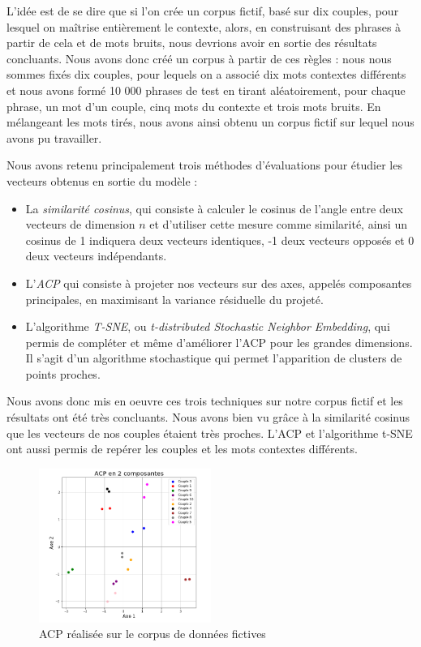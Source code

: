 \documentclass[11pt,french,french]{article}
\begin{document}
L'idée est de se dire que si l'on crée un corpus fictif, basé sur dix
couples, pour lesquel on maîtrise entièrement le contexte, alors, en
construisant des phrases à partir de cela et de mots bruits, nous
devrions avoir en sortie des résultats concluants. Nous avons donc créé
un corpus à partir de ces règles : nous nous sommes fixés dix couples,
pour lequels on a associé dix mots contextes différents et nous avons
formé 10 000 phrases de test en tirant aléatoirement, pour chaque
phrase, un mot d'un couple, cinq mots du contexte et trois mots bruits.
En mélangeant les mots tirés, nous avons ainsi obtenu un corpus fictif
sur lequel nous avons pu travailler.

Nous avons retenu principalement trois méthodes d'évaluations pour
étudier les vecteurs obtenus en sortie du modèle :

\begin{itemize}
 \item La \textit{similarité cosinus}, qui consiste à calculer le cosinus de l'angle entre deux vecteurs de dimension $n$ et d'utiliser cette mesure comme similarité, ainsi un cosinus de 1 indiquera deux vecteurs identiques, -1 deux vecteurs opposés et 0 deux vecteurs indépendants.
 \item L'\textit{ACP} qui consiste à projeter nos vecteurs sur des axes, appelés composantes principales, en maximisant la variance résiduelle du projeté. 
 \item L'algorithme \textit{T-SNE}, ou \textit{t-distributed Stochastic Neighbor Embedding}, qui permis de compléter et même d'améliorer l'ACP pour les grandes dimensions. Il s'agit d'un algorithme stochastique qui permet l'apparition de clusters de points proches.
\end{itemize}

Nous avons donc mis en oeuvre ces trois techniques sur notre corpus
fictif et les résultats ont été très concluants. Nous avons bien vu
grâce à la similarité cosinus que les vecteurs de nos couples étaient
très proches. L'ACP et l'algorithme t-SNE ont aussi permis de repérer
les couples et les mots contextes différents.

\begin{figure}
\centering
\includegraphics[width=0.50000\textwidth]{acp_fictif.png}
\caption{ACP réalisée sur le corpus de données fictives}
\end{figure}
\end{document}
